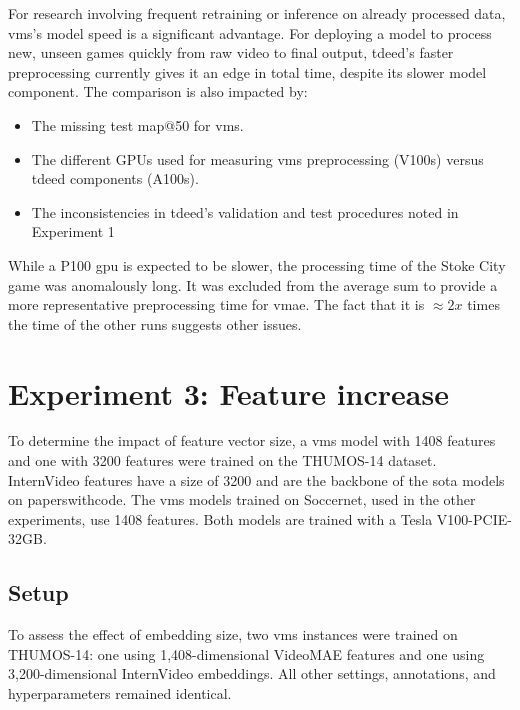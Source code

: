 For research involving frequent retraining or inference on already processed data, \acrshort{vms}'s model speed is a significant advantage. For deploying a model to process new, unseen games quickly from raw video to final output, \acrshort{tdeed}'s faster preprocessing currently gives it an edge in total time, despite its slower model component. The comparison is also impacted by: 

\begin{itemize}
    \item The missing test \acrshort{map}@50 for \acrshort{vms}.
    \item The different GPUs used for measuring \acrshort{vms} preprocessing (V100s) versus \acrshort{tdeed} components (A100s).
    \item The inconsistencies in \acrshort{tdeed}'s validation and test procedures noted in Experiment 1
\end{itemize}

While a P100 \acrshort{gpu} is expected to be slower, the processing time of the Stoke City game was anomalously long. It was excluded from the average sum to provide a more representative preprocessing time for \acrshort{vmae}. The fact that it is $\approx2x$ times the time of the other runs suggests other issues. 

\section{Experiment 3: Feature increase}
\label{sec:experiment3}
To determine the impact of feature vector size, a \acrshort{vms} model with 1408 features and one with 3200 features were trained on the THUMOS-14 dataset.
InternVideo features have a size of 3200 and are the backbone of the \acrshort{sota} models on paperswithcode. The \acrshort{vms} models trained on Soccernet, used in the other experiments, use 1408 features. Both models are trained with a Tesla V100-PCIE-32GB.


\subsection{Setup}
\label{ssec:ex3_setup}

To assess the effect of embedding size, two \acrshort{vms} instances were trained on THUMOS-14\cite{dataset:thumos}: one using 1,408-dimensional VideoMAE features and one using 3,200-dimensional InternVideo embeddings. All other settings, annotations, and hyperparameters remained identical.

